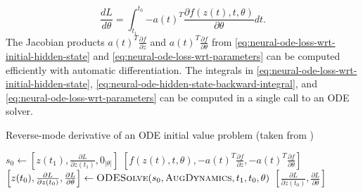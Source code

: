 \begin{equation}
    \frac{dL}{d\theta} = \int_{t_1}^{t_0}{-a(t)^T\frac{\partial f(z(t), t, \theta)}{\partial \theta}} dt.
    \label{eq:neural-ode-loss-wrt-parameters}
\end{equation}
The Jacobian products $a(t)^T\frac{\partial f}{\partial z}$ and $a(t)^T\frac{\partial f}{\partial \theta}$ from \autoref{eq:neural-ode-loss-wrt-initial-hidden-state} and \autoref{eq:neural-ode-loss-wrt-parameters} can be computed efficiently with automatic differentiation.
The integrals in \autoref{eq:neural-ode-loss-wrt-initial-hidden-state}, \autoref{eq:neural-ode-hidden-state-backward-integral}, and \autoref{eq:neural-ode-loss-wrt-parameters} can be computed in a single call to an \gls{ODE} solver.

\begin{algorithm}
    \caption{Reverse-mode derivative of an ODE initial value problem (taken from \cite{chenNeuralOrdinaryDifferential2019})}
    \label{alg:neural-ode-reverse-mode-diff}
    \begin{algorithmic}
            \State $s_0 \gets \left[z(t_1), \frac{\partial L}{\partial z(t_1)}, 0_{|\theta|}\right]$
                \State \Return $\left[f(z(t), t, \theta), -a(t)^T\frac{\partial f}{\partial z}, -a(t)^T\frac{\partial f}{\partial \theta}\right]$
            \EndFunction
            \State $\left[z(t_0), \frac{\partial L}{\partial z(t_0)}, \frac{\partial L}{\partial \theta}\right] \gets \Call{ODESolve}{s_0, \textproc{AugDynamics}, t_1, t_0, \theta}$
            \State \Return $\left[\frac{\partial L}{\partial z(t_0)}, \frac{\partial L}{\partial \theta}\right]$
        \EndFunction
    \end{algorithmic}
\end{algorithm}